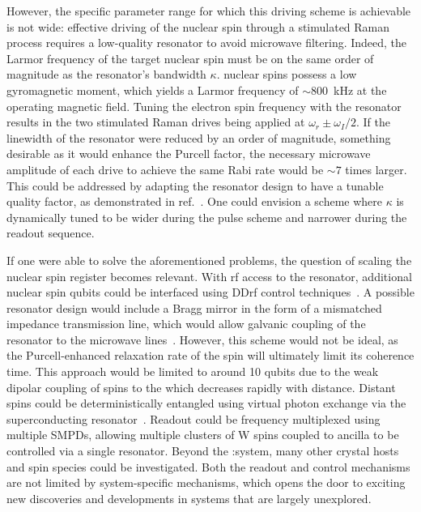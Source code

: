 However, the specific parameter range for which this driving scheme is achievable is not wide: effective driving of the nuclear spin through a stimulated Raman process requires a low-quality resonator to avoid microwave filtering. Indeed, the Larmor frequency of the target nuclear spin must be on the same order of magnitude as the resonator's bandwidth $\kappa$. \W nuclear spins possess a low gyromagnetic moment, which yields a Larmor frequency of $\sim 800$~kHz at the operating magnetic field. Tuning the electron spin frequency with the resonator results in the two stimulated Raman drives being applied at $\omega_r \pm \omega_I / 2$. If the linewidth of the resonator were reduced by an order of magnitude, something desirable as it would enhance the Purcell factor, the necessary microwave amplitude of each drive to achieve the same Rabi rate would be $\sim 7$ times larger. This could be addressed by adapting the resonator design to have a tunable quality factor, as demonstrated in ref.~. One could envision a scheme where $\kappa$ is dynamically tuned to be wider during the pulse scheme and narrower during the readout sequence. 

If one were able to solve the aforementioned problems, the question of scaling the nuclear spin register becomes relevant. With rf access to the resonator, additional nuclear spin qubits could be interfaced using DDrf control techniques~. A possible resonator design would include a Bragg mirror in the form of a mismatched impedance transmission line, which would allow galvanic coupling of the resonator to the microwave lines~. However, this scheme would not be ideal, as the Purcell-enhanced relaxation rate of the \Er spin will ultimately limit its coherence time. This approach would be limited to around 10 qubits due to the weak dipolar coupling of \W spins to the \Er which decreases rapidly with distance. Distant \Er spins could be deterministically entangled using virtual photon exchange via the superconducting resonator~. Readout could be frequency multiplexed using multiple SMPDs, allowing multiple clusters of W spins coupled to \Er ancilla to be controlled via a single resonator. Beyond the \Er:\Ca system, many other crystal hosts and spin species could be investigated. Both the readout and control mechanisms are not limited by system-specific mechanisms, which opens the door to exciting new discoveries and developments in systems that are largely unexplored.
